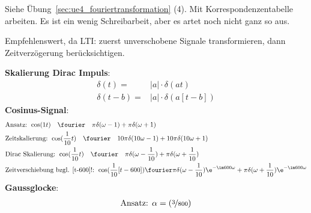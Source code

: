 \begin{Werkzeug}
Siehe Übung~\ref{sec:ue4_fouriertransformation} (4).
Mit Korrespondenzentabelle arbeiten. Es ist ein wenig Schreibarbeit,
aber es artet noch nicht ganz so aus.
\end{Werkzeug}
\begin{Ansatz}
Empfehlenswert, da LTI: zuerst unverschobene Signale transformieren,
dann Zeitverzögerung berücksichtigen.
\end{Ansatz}
\begin{ExCalc}

\noindent\textbf{Skalierung Dirac Impuls}:
\begin{align}
\delta(t) =& |a| \cdot \delta(a t)\\
\delta(t-b) = & |a| \cdot \delta(a [t-b])
\end{align}
%
\noindent\textbf{Cosinus-Signal}:
\begin{align}
&\text{Ansatz: } \cos(1 t) \quad\fourier\quad \pi\delta(\omega - 1) + \pi\delta(\omega + 1)\\
&\text{Zeitskalierung: } \cos(\frac{1}{10} t) \quad\fourier\quad 10 \pi\delta(10 \omega - 1) + 10 \pi\delta(10 \omega + 1) \\
&\text{Dirac Skalierung: } \cos(\frac{1}{10} t) \quad\fourier\quad \pi\delta(\omega - \frac{1}{10}) + \pi\delta(\omega + \frac{1}{10}) \\
&\text{Zeitverschiebung bzgl. [t-600]!: } \cos(\frac{1}{10} [t - 600]) \fourier \pi\delta(\omega - \frac{1}{10})\e^{-\im 600 \omega} + \pi\delta(\omega + \frac{1}{10})\e^{-\im 600 \omega}
\end{align}
%
\noindent\textbf{Gaussglocke}:
\begin{align}
&\text{Ansatz: } \alpha = \left(\nicefrac{3}{800}\right)\\

\end{align}
\end{ExCalc}
